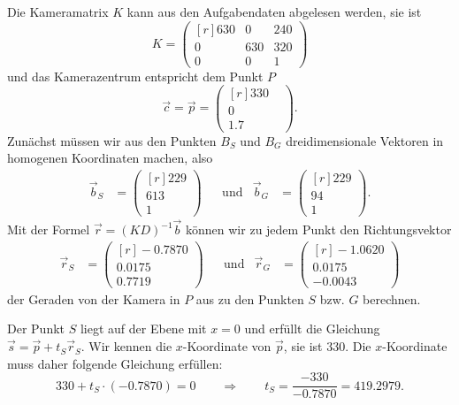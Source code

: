 \begin{loesung}
\begin{teilaufgaben}
\item
Die Kameramatrix $K$ kann aus den Aufgabendaten abgelesen werden, sie ist
\[
K
=
\begin{pmatrix*}[r]
630&  0&240\\
  0&630&320\\
  0&  0&  1
\end{pmatrix*}
\]
und das Kamerazentrum entspricht dem Punkt $P$
\[
\vec c = \vec p = 
\begin{pmatrix*}[r]
330\phantom{.0}\\ 0\phantom{.0}\\ 1.7
\end{pmatrix*}.
\]
Zunächst müssen wir aus den Punkten $B_S$ und $B_G$ dreidimensionale Vektoren
in homogenen Koordinaten machen, also
\[
\begin{aligned}
\vec b_S &= \begin{pmatrix*}[r]229\\613\\1\end{pmatrix*}
&&\text{und}&
\vec b_G &= \begin{pmatrix*}[r]229\\94\\1\end{pmatrix*}.
\end{aligned}
\]
Mit der Formel $\vec{r} = (KD)^{-1} \vec b$ können wir zu jedem Punkt
den Richtungsvektor
\[
\begin{aligned}
\vec r_S
&=
\begin{pmatrix*}[r]
-0.7870 \\
 0.0175 \\
 0.7719
\end{pmatrix*}
&&\text{und}&
\vec r_G &= 
\begin{pmatrix*}[r]
-1.0620 \\
 0.0175 \\
-0.0043
\end{pmatrix*}
\end{aligned}
\]
der Geraden von der Kamera in $P$ aus zu den Punkten $S$ bzw. $G$ berechnen.

Der Punkt $S$ liegt auf der Ebene mit $x=0$ und erfüllt die
Gleichung $\vec s = \vec {p} + t_S\vec{r}_S$.
Wir kennen die $x$-Koordinate von $\vec{p}$, sie ist $330$.
Die $x$-Koordinate muss daher folgende Gleichung erfüllen:
\[
330 + t_S\cdot (-0.7870) = 0
\qquad\Rightarrow\qquad
t_S = \frac{-330}{-0.7870}=419.2979.
\]


\end{teilaufgaben}
\end{loesung}

